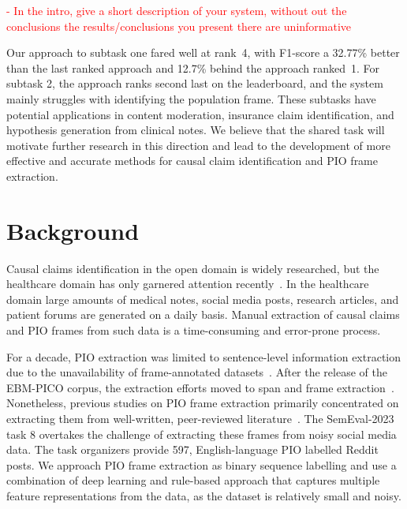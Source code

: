 \documentclass[11pt]{article}
\begin{document}
\textcolor{red}{- In the intro, give a short description of your system, without out the conclusions the results/conclusions you present there are uninformative}

Our approach to subtask one fared well at rank~4, with F1-score a 32.77\% better than the last ranked approach and 12.7\% behind the approach ranked~1.
For subtask 2, the approach ranks second last on the leaderboard, and the system mainly struggles with identifying the population frame.
These subtasks have potential applications in content moderation, insurance claim identification, and hypothesis generation from clinical notes.
We believe that the shared task will motivate further research in this direction and lead to the development of more effective and accurate methods for causal claim identification and PIO frame extraction.
%
%
%
\section{Background}
\label{background}
%
Causal claims identification in the open domain is widely researched, but the healthcare domain has only garnered attention recently~\cite{mueller2018extracting,wang-etal-2019-identifying,parveen-etal-2021-automatic,islam-etal-2021-identifying}.
In the healthcare domain large amounts of medical notes, social media posts, research articles, and patient forums are generated on a daily basis.
Manual extraction of causal claims and PIO frames from such data is a time-consuming and error-prone process.


For a decade, PIO extraction was limited to sentence-level information extraction due to the unavailability of frame-annotated datasets~\cite{boudin2010combining,jin2018pico}.
After the release of the EBM-PICO corpus, the extraction efforts moved to span and frame extraction~\cite{nye2018corpus}.
Nonetheless, previous studies on PIO frame extraction primarily concentrated on extracting them from well-written, peer-reviewed literature~\cite{brockmeier2019improving,zhang2020unlocking,dhrangadhariya2021end}.
The SemEval-2023 task 8 overtakes the challenge of extracting these frames from noisy social media data.
The task organizers provide 597, English-language PIO labelled Reddit posts.
We approach PIO frame extraction as binary sequence labelling and use a combination of deep learning and rule-based approach that captures multiple feature representations from the data, as the dataset is relatively small and noisy.
\end{document}
